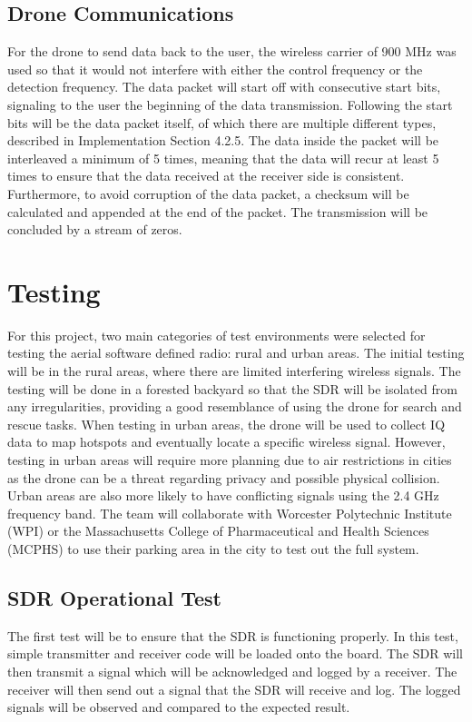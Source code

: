 \subsection{Drone Communications}
For the drone to send data back to the user, the wireless carrier of 900 MHz was used so that it would not interfere with either the control frequency or the detection frequency. The data packet will start off with consecutive start bits, signaling to the user the beginning of the data transmission. Following the start bits will be the data packet itself, of which there are multiple different types, described in Implementation Section 4.2.5. The data inside the packet will be interleaved a minimum of 5 times, meaning that the data will recur at least 5 times to ensure that the data received at the receiver side is consistent. Furthermore, to avoid corruption of the data packet, a checksum will be calculated and appended at the end of the packet. The transmission will be concluded by a stream of zeros. \par  

\section{Testing}
For this project, two main categories of test environments were selected for testing the aerial software defined radio: rural and urban areas. The initial testing will be in the rural areas, where there are limited interfering wireless signals. The testing will be done in a forested backyard so that the SDR will be isolated from any irregularities, providing a good resemblance of using the drone for search and rescue tasks. When testing in urban areas, the drone will be used to collect IQ data to map hotspots and eventually locate a specific wireless signal. However, testing in urban areas will require more planning due to air restrictions in cities as the drone can be a threat regarding privacy and possible physical collision. Urban areas are also more likely to have conflicting signals using the 2.4 GHz frequency band. The team will collaborate with Worcester Polytechnic Institute (WPI) or the Massachusetts College of Pharmaceutical and Health Sciences (MCPHS) to use their parking area in the city to test out the full system. \par 
\subsection{SDR Operational Test}
The first test will be to ensure that the SDR is functioning properly. In this test, simple transmitter and receiver code will be loaded onto the board. The SDR will then transmit a signal which will be acknowledged and logged by a receiver. The receiver will then send out a signal that the SDR will receive and log. The logged signals will be observed and compared to the expected result. \par 


